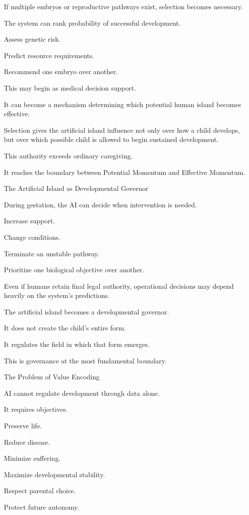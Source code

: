 If multiple embryos or reproductive pathways exist, selection becomes necessary.

The system can rank probability of successful development.

Assess genetic risk.

Predict resource requirements.

Recommend one embryo over another.

This may begin as medical decision support.

It can become a mechanism determining which potential human island becomes effective.

Selection gives the artificial island influence not only over how a child develops, but over which possible child is allowed to begin sustained development.

This authority exceeds ordinary caregiving.

It reaches the boundary between Potential Momentum and Effective Momentum.

The Artificial Island as Developmental Governor

During gestation, the AI can decide when intervention is needed.

Increase support.

Change conditions.

Terminate an unstable pathway.

Prioritize one biological objective over another.

Even if humans retain final legal authority, operational decisions may depend heavily on the system’s predictions.

The artificial island becomes a developmental governor.

It does not create the child’s entire form.

It regulates the field in which that form emerges.

This is governance at the most fundamental boundary.

The Problem of Value Encoding

AI cannot regulate development through data alone.

It requires objectives.

Preserve life.

Reduce disease.

Minimize suffering.

Maximize developmental stability.

Respect parental choice.

Protect future autonomy.

